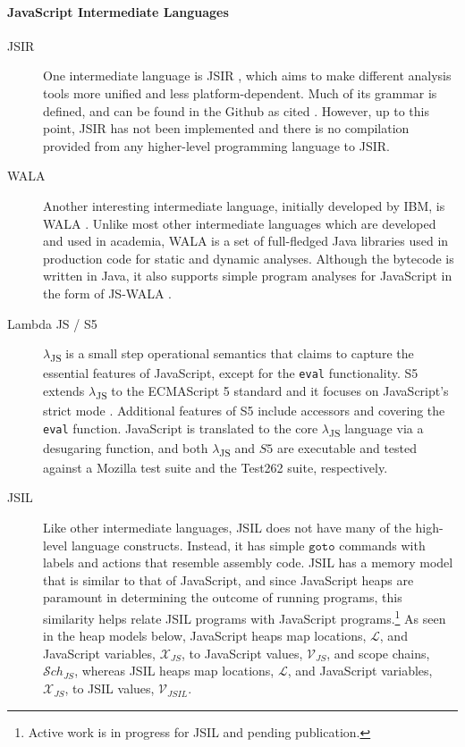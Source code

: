 \documentclass[a4paper,11pt,twoside]{report}
\begin{document}
\paragraph{JavaScript Intermediate Languages}
\begin{description}
\item[JSIR] One intermediate language is JSIR \cite{Livshits:2016:Misc}, which aims to make different analysis tools more unified and less platform-dependent. Much of its grammar is defined, and can be found in the Github as cited \cite{Livshits:2016:Misc}. However, up to this point, JSIR has not been implemented and there is no compilation provided from any higher-level programming language to JSIR.

\item[WALA] Another interesting intermediate language, initially developed by IBM, is WALA \cite{WALA}. Unlike most other intermediate languages which are developed and used in academia, WALA is a set of full-fledged Java libraries used in production code for static and dynamic analyses. Although the bytecode is written in Java, it also supports simple program analyses for JavaScript in the form of JS-WALA \cite{WALA2}.

\item[Lambda JS / S5] $\lambda$\textsubscript{JS} \cite{Guha:2010} is a small step operational semantics that claims to capture the essential features of JavaScript, except for the \texttt{eval} functionality. S5 extends $\lambda$\textsubscript{JS} to the ECMAScript 5 standard and it focuses on JavaScript's strict mode \cite{Politz:2012}. Additional features of S5 include accessors and covering the \texttt{eval} function. JavaScript is translated to the core $\lambda$\textsubscript{JS} language via a desugaring function, and both $\lambda$\textsubscript{JS} and $S5$ are executable and tested against a Mozilla test suite and the Test262 suite, respectively.

\item[JSIL] Like other intermediate languages, JSIL does not have many of the high-level language constructs. Instead, it has simple $\texttt{goto}$ commands with labels and actions that resemble assembly code. JSIL has a memory model that is similar to that of JavaScript, and since JavaScript heaps are paramount in determining the outcome of running programs, this similarity helps relate JSIL programs with JavaScript programs.\footnote{Active work is in progress for JSIL and pending publication.} As seen in the heap models below, JavaScript heaps map locations, $\mathcal{L}$, and JavaScript variables, $\mathcal{X}_{JS}$, to JavaScript values, $\mathcal{V}_{JS}$, and scope chains, $\mathcal{S}ch_{JS}$, whereas JSIL heaps map locations, $\mathcal{L}$, and JavaScript variables, $\mathcal{X}_{JS}$, to JSIL values, $\mathcal{V}_{JSIL}$.


\end{description}
\end{document}

